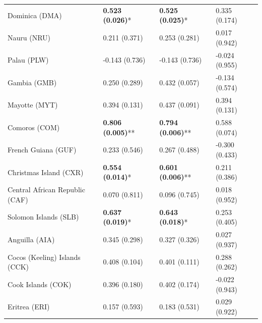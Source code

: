 \begin{longtable}{p{5cm}p{3cm}p{3cm}p{5cm}}
Dominica (DMA) & \textcolor{atlLime600}{\textbf{0.523 (0.026)}*} & \textcolor{atlLime600}{\textbf{0.525 (0.025)}*} & \textcolor{atlOrange600}{0.335 (0.174)} \\
Nauru (NRU) & \textcolor{atlOrange600}{0.211 (0.371)} & \textcolor{atlOrange600}{0.253 (0.281)} & \textcolor{atlOrange600}{0.017 (0.942)} \\
Palau (PLW) & \textcolor{atlOrange600}{-0.143 (0.736)} & \textcolor{atlOrange600}{-0.143 (0.736)} & \textcolor{atlOrange600}{-0.024 (0.955)} \\
Gambia (GMB) & \textcolor{atlOrange600}{0.250 (0.289)} & \textcolor{atlOrange600}{0.432 (0.057)} & \textcolor{atlOrange600}{-0.134 (0.574)} \\
Mayotte (MYT) & \textcolor{atlOrange600}{0.394 (0.131)} & \textcolor{atlOrange600}{0.437 (0.091)} & \textcolor{atlOrange600}{0.394 (0.131)} \\
Comoros (COM) & \textcolor{atlLime600}{\textbf{0.806 (0.005)}**} & \textcolor{atlLime600}{\textbf{0.794 (0.006)}**} & \textcolor{atlOrange600}{0.588 (0.074)} \\
French Guiana (GUF) & \textcolor{atlOrange600}{0.233 (0.546)} & \textcolor{atlOrange600}{0.267 (0.488)} & \textcolor{atlOrange600}{-0.300 (0.433)} \\
Christmas Island (CXR) & \textcolor{atlLime600}{\textbf{0.554 (0.014)}*} & \textcolor{atlLime600}{\textbf{0.601 (0.006)}**} & \textcolor{atlOrange600}{0.211 (0.386)} \\
Central African Republic (CAF) & \textcolor{atlOrange600}{0.070 (0.811)} & \textcolor{atlOrange600}{0.096 (0.745)} & \textcolor{atlOrange600}{0.018 (0.952)} \\
Solomon Islands (SLB) & \textcolor{atlLime600}{\textbf{0.637 (0.019)}*} & \textcolor{atlLime600}{\textbf{0.643 (0.018)}*} & \textcolor{atlOrange600}{0.253 (0.405)} \\
Anguilla (AIA) & \textcolor{atlOrange600}{0.345 (0.298)} & \textcolor{atlOrange600}{0.327 (0.326)} & \textcolor{atlOrange600}{0.027 (0.937)} \\
Cocos (Keeling) Islands (CCK) & \textcolor{atlOrange600}{0.408 (0.104)} & \textcolor{atlOrange600}{0.401 (0.111)} & \textcolor{atlOrange600}{0.288 (0.262)} \\
Cook Islands (COK) & \textcolor{atlOrange600}{0.396 (0.180)} & \textcolor{atlOrange600}{0.402 (0.174)} & \textcolor{atlOrange600}{-0.022 (0.943)} \\
Eritrea (ERI) & \textcolor{atlOrange600}{0.157 (0.593)} & \textcolor{atlOrange600}{0.183 (0.531)} & \textcolor{atlOrange600}{0.029 (0.922)} \\

\end{longtable}
